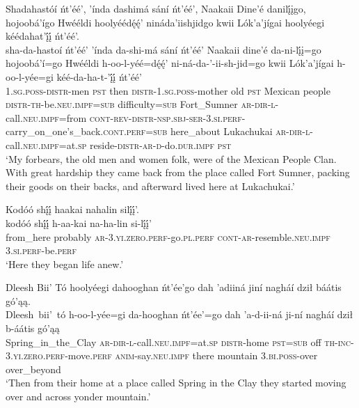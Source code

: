 \ea\label{ex:text1-1-1}
Shadahastóí ńt’éé’, ’índa dashimá sání ńt’éé’, Naakaii Dine’é danilį́įgo, hojoobá’ígo Hwééldi hoolyéédę́ę́’ nináda’iishjidgo kwii Lók’a’jígai hoolyéegi kéédahat’į́į́ ńt’éé’.\\
\gll sha-da-hastoí	ńt’éé’	’índa	da-shi-má	sání	ńt’éé’	Naakaii	dine’é	da-ni-lį́į=go	hojoobá’í=go	Hwééldi h-oo-l-yéé=dę́ę́’	ni-ná-da-’-ii-sh-jid=go	kwii	Lók’a’jígai	h-oo-l-yée=gi	kéé-da-ha-t-’į́į́ ńt’éé’\\
     1.\textsc{sg}.\textsc{poss}-\textsc{distr}-men	\textsc{pst}	then	\textsc{distr}-1.\textsc{sg}.\textsc{poss}-mother	old	\textsc{pst}	Mexican	people	\textsc{distr}-\textsc{th}-be.\textsc{neu}.\textsc{impf}=\textsc{sub}	difficulty=\textsc{sub}	Fort\_Sumner \textsc{ar}-\textsc{dir}-\textsc{l}-call.\textsc{neu}.\textsc{impf}=from	\textsc{cont}-\textsc{rev}-\textsc{distr}-\textsc{nsp}.\textsc{sbj}-\textsc{ser}-3.\textsc{si}.\textsc{perf}-carry\_on\_one’s\_back.\textsc{cont}.\textsc{perf}=\textsc{sub}	here\_about	Lukachukai	\textsc{ar}-\textsc{dir}-\textsc{l}-call.\textsc{neu}.\textsc{impf}=at.\textsc{sp}	reside-\textsc{distr}-\textsc{ar}-\textsc{d}-do.\textsc{dur}.\textsc{impf} \textsc{pst}\\
\glt `My forbears, the old men and women folk, were of the Mexican People Clan. With great hardship they came back from the place called Fort Sumner, packing their goods on their backs, and afterward lived here at Lukachukai.'
\z

\ea\label{ex:text1-1-2}
Kodóó shį́į́ haakai nahalin silį́į́’.\\
\gll kodóó	shį́į́	h-aa-kai	na-ha-lin	si-lį́į́’\\
     from\_here	probably	\textsc{ar}-3.\textsc{yi}.\textsc{zero}.\textsc{perf}-go.\textsc{pl}.\textsc{perf}	\textsc{cont}-\textsc{ar}-resemble.\textsc{neu}.\textsc{impf}	3.\textsc{si}.\textsc{perf}-be.\textsc{perf}\\
\glt `Here they began life anew.'
\z

\ea\label{ex:text1-1-3}
Dleesh Bii’ Tó hoolyéegi dahooghan ńt’ée’go dah ’adiiná jiní nagháí dził báátis gó’ąą.\\
\gll Dleesh~bii’~{tó}	h-oo-l-yée=gi	da-hooghan	ńt’ée’=go	dah	’a-d-ii-ná	ji-ní	nagháí	dził	b-áátis	gó’ąą\\
     Spring\_in\_the\_Clay	\textsc{ar}-\textsc{dir}-\textsc{l}-call.\textsc{neu}.\textsc{impf}=at.\textsc{sp}	\textsc{distr}-home	\textsc{pst}=\textsc{sub}	off	\textsc{th}-\textsc{inc}-3.\textsc{yi}.\textsc{zero}.\textsc{perf}-move.\textsc{perf}	\textsc{anim}-say.\textsc{neu}.\textsc{impf}	there	mountain	3.\textsc{bi}.\textsc{poss}-over	over\_beyond\\
\glt `Then from their home at a place called Spring in the Clay they started moving over and across yonder mountain.'
\z

